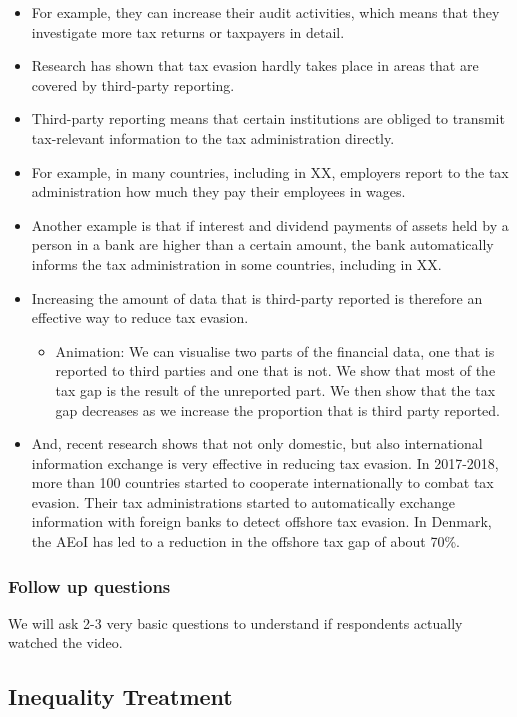 \documentclass[11pt]{article}
\begin{document}
\begin{itemize}
\item For example, they can increase their audit activities, which means that they investigate more tax returns or taxpayers in detail.  
\item Research has shown that tax evasion hardly takes place in areas that are covered by third-party reporting.
\item Third-party reporting means that certain institutions are obliged to transmit tax-relevant information to the tax administration directly.
\item For example, in many countries, including in XX, employers report to the tax administration how much they pay their employees in wages.
\item Another example is that if interest and dividend payments of assets held by a person in a bank are higher than a certain amount, the bank automatically informs the tax administration in some countries, including in XX.
\item Increasing the amount of data that is third-party reported is therefore an effective way to reduce tax evasion.
\begin{itemize}
    \item Animation: We can visualise two parts of the financial data, one that is reported to third parties and one that is not. We show that most of the tax gap is the result of the unreported part. We then show that the tax gap decreases as we increase the proportion that is third party reported.
\end{itemize}
\item And, recent research shows that not only domestic, but also international information exchange is very effective in reducing tax evasion. In 2017-2018, more than 100 countries started to cooperate internationally to combat tax evasion. Their tax administrations started to automatically exchange information with foreign banks to detect offshore tax evasion. In Denmark, the AEoI has led to a reduction in the offshore tax gap of about 70\%. 
\end{itemize}
\subsubsection*{Follow up questions}
We will ask 2-3 very basic questions to understand if respondents actually watched the video.
\subsection{Inequality Treatment}
\end{document}
